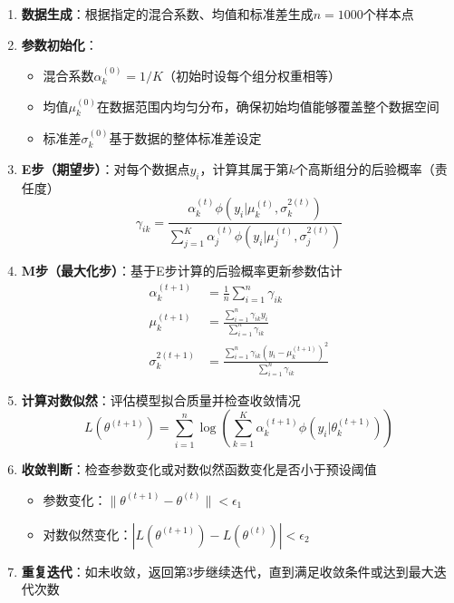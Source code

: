 \documentclass[a4paper,12pt]{ctexart} %
\begin{document}
\begin{enumerate}
    \item \textbf{数据生成}：根据指定的混合系数、均值和标准差生成$n=1000$个样本点
    
    \item \textbf{参数初始化}：
    \begin{itemize}
        \item 混合系数$\alpha_k^{(0)} = 1/K$（初始时设每个组分权重相等）
        \item 均值$\mu_k^{(0)}$在数据范围内均匀分布，确保初始均值能够覆盖整个数据空间
        \item 标准差$\sigma_k^{(0)}$基于数据的整体标准差设定
    \end{itemize}
    
    \item \textbf{E步（期望步）}：对每个数据点$y_i$，计算其属于第$k$个高斯组分的后验概率（责任度）
    \begin{equation*}
    \gamma_{ik} = \frac{\alpha_k^{(t)}\phi(y_i|\mu_k^{(t)}, \sigma_k^{2(t)})}{\sum_{j=1}^K \alpha_j^{(t)}\phi(y_i|\mu_j^{(t)}, \sigma_j^{2(t)})}
    \end{equation*}
    
    \item \textbf{M步（最大化步）}：基于E步计算的后验概率更新参数估计
    \begin{align*}
    \alpha_k^{(t+1)} &= \frac{1}{n} \sum_{i=1}^n \gamma_{ik} \\
    \mu_k^{(t+1)} &= \frac{\sum_{i=1}^n \gamma_{ik}y_i}{\sum_{i=1}^n \gamma_{ik}} \\
    \sigma_k^{2(t+1)} &= \frac{\sum_{i=1}^n \gamma_{ik}(y_i-\mu_k^{(t+1)})^2}{\sum_{i=1}^n \gamma_{ik}}
    \end{align*}
    
    \item \textbf{计算对数似然}：评估模型拟合质量并检查收敛情况
    \begin{equation*}
    L(\theta^{(t+1)}) = \sum_{i=1}^n\log\left(\sum_{k=1}^K \alpha_k^{(t+1)}\phi(y_i|\theta_k^{(t+1)})\right)
    \end{equation*}
    
    \item \textbf{收敛判断}：检查参数变化或对数似然函数变化是否小于预设阈值
    \begin{itemize}
        \item 参数变化：$\|\theta^{(t+1)} - \theta^{(t)}\| < \epsilon_1$
        \item 对数似然变化：$|L(\theta^{(t+1)}) - L(\theta^{(t)})| < \epsilon_2$
    \end{itemize}
    
    \item \textbf{重复迭代}：如未收敛，返回第3步继续迭代，直到满足收敛条件或达到最大迭代次数
\end{enumerate}
\end{document}
